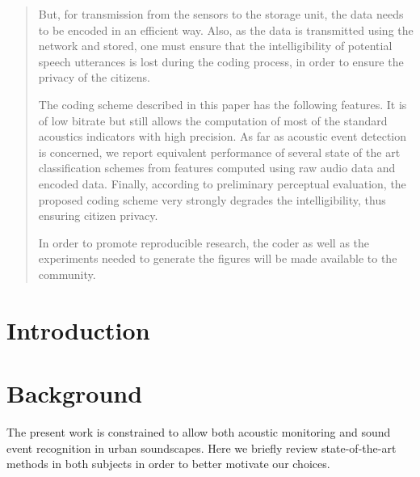 \documentclass[final,3p,times,twocolumn]{elsarticle}
\begin{document}
\begin{frontmatter}
\begin{abstract}
But, for transmission from the sensors to the storage unit, the data needs to be encoded in an efficient way. Also, as the data is transmitted using the network and stored, one must ensure that the intelligibility of potential speech utterances is lost during the coding process, in order to ensure the privacy of the citizens.

The coding scheme described in this paper has the following features. It is of low bitrate but still allows the computation of most of the standard acoustics indicators with high precision. As far as acoustic event detection is concerned, we report equivalent performance of several state of the art classification schemes from features computed using raw audio data and encoded data. Finally, according to preliminary perceptual evaluation, the proposed coding scheme very strongly degrades the intelligibility, thus ensuring citizen privacy.

In order to promote reproducible research, the coder as well as the experiments needed to generate the figures will be made available to the community.



\end{abstract}

\begin{keyword}



\end{keyword}

\end{frontmatter}

\clearpage
\section{Introduction}

\section{Background}


The present work is constrained to allow both acoustic monitoring and sound event recognition in urban soundscapes. Here we briefly review state-of-the-art methods in both subjects in order to better motivate our choices.
\end{document}
